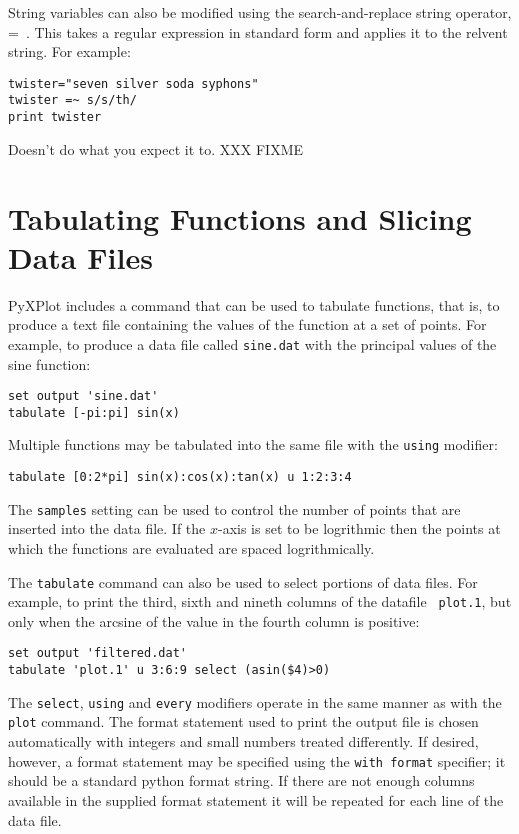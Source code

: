 String variables can also be modified using the search-and-replace string
operator, =~.  This takes a regular expression in standard form and applies it
to the relvent string.  For example:

\begin{verbatim}
twister="seven silver soda syphons"
twister =~ s/s/th/
print twister
\end{verbatim}

Doesn't do what you expect it to. XXX FIXME

\section{Tabulating Functions and Slicing Data Files}

PyXPlot includes a command that can be used to tabulate functions, that is, to
produce a text file containing the values of the function at a set of points.
For example, to produce a data file called {\tt sine.dat} with the principal
values of the sine function:

\begin{verbatim}
set output 'sine.dat'
tabulate [-pi:pi] sin(x)
\end{verbatim}

Multiple functions may be tabulated into the same file with the {\tt using}
modifier:

\begin{verbatim}
tabulate [0:2*pi] sin(x):cos(x):tan(x) u 1:2:3:4
\end{verbatim}

The {\tt samples} setting can be used to control the number of points that are
inserted into the data file.  If the $x$-axis is set to be logrithmic then the
points at which the functions are evaluated are spaced logrithmically.

The {\tt tabulate} command can also be used to select portions of data files.
For example, to print the third, sixth and nineth columns of the datafile {\tt
plot.1}, but only when the arcsine of the value in the fourth column is
positive:

\begin{verbatim}
set output 'filtered.dat'
tabulate 'plot.1' u 3:6:9 select (asin($4)>0)
\end{verbatim}

\noindent The {\tt select}, {\tt using} and {\tt every} modifiers operate in the
same manner as with the {\tt plot} command.  The format statement used to print
the output file is chosen automatically with integers and small numbers treated
differently.  If desired, however, a format statement may be specified using the
{\tt with format} specifier; it should be a standard python format string.  If
there are not enough columns available in the supplied format statement it will
be repeated for each line of the data file.

